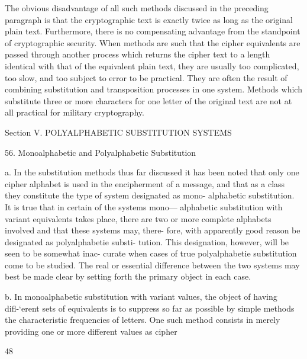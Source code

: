 The obvious disadvantage of all such methods discussed in the preceding paragraph is that the cryptographic text is exactly twice as long as
the original plain text. Furthermore, there is no compensating advantage
from the standpoint of cryptographic security. When methods are such
that the cipher equivalents are passed through another process which returns the cipher text to a length identical with that of the equivalent plain
text, they are usually too complicated, too slow, and too subject to error
to be practical. They are often the result of combining substitution and
transposition processes in one system. Methods which substitute three
or more characters for one letter of the original text are not at all practical for military cryptography.

Section V. POLYALPHABETIC SUBSTITUTION
SYSTEMS

56. Monoalphabetic and Polyalphabetic Substitution

a. In the substitution methods thus far discussed it has been noted that
only one cipher alphabet is used in the encipherment of a message, and
that as a class they constitute the type of system designated as mono-
alphabetic substitution. It is true that in certain of the systems mono—
alphabetic substitution with variant equivalents takes place, there are two
or more complete alphabets involved and that these systems may, there-
fore, with apparently good reason be designated as polyalphabetie substi-
tution. This designation, however, will be seen to be somewhat inac-
curate when cases of true polyalphabetie substitution come to be studied.
The real or essential difference between the two systems may best be
made clear by setting forth the primary object in each case.

b. In monoalphabetic substitution with variant values, the object of
having diﬂ-‘erent sets of equivalents is to suppress so far as possible by
simple methods the characteristic frequencies of letters. One such method
consists in merely providing one or more different values as cipher

48

 

 

